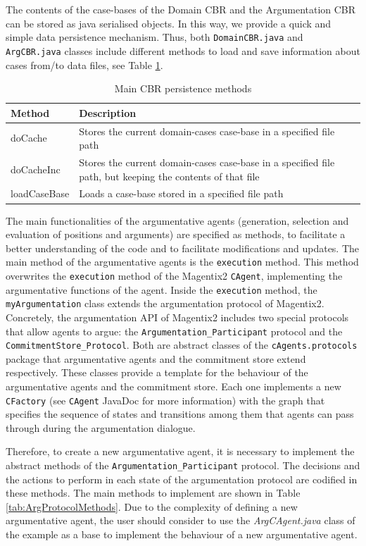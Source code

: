 The contents of the case-bases of the Domain CBR and the Argumentation CBR can be stored as java serialised objects. In this way, we provide a quick and simple data persistence mechanism. Thus, both \lstinline{DomainCBR.java} and \lstinline{ArgCBR.java} classes include different methods to load and save information about cases from/to data files, see Table \ref{tab:CBRPersistenceMethods}.
\begin{table}[h!t]
\begin{tabular}{|l|p{11cm}|}
\hline
\textbf{Method} &  \textbf{Description} \\ \hline
doCache &  Stores the current domain-cases case-base in a specified file path \\ \hline
doCacheInc &  Stores the current domain-cases case-base in a specified file path, but keeping the contents of that file \\ \hline
loadCaseBase &  Loads a case-base stored in a specified file path \\ \hline
\end{tabular}
\caption{Main CBR persistence methods}
\label{tab:CBRPersistenceMethods}
\end{table}

The main functionalities of the argumentative agents (generation, selection and evaluation of positions and arguments) are specified as methods, to facilitate a better understanding of the code and to facilitate modifications and updates. The main method of the argumentative agents is the \lstinline{execution} method. This method overwrites the \lstinline{execution} method of the Magentix2 \texttt{CAgent}, implementing the argumentative functions of the agent. Inside the \lstinline{execution} method, the \lstinline{myArgumentation} class extends the argumentation protocol of Magentix2. Concretely, the argumentation API of Magentix2 includes two special protocols that allow agents to argue: the \texttt{Argumentation\_Participant} protocol and the \texttt{CommitmentStore\_Protocol}. Both are abstract classes of the \lstinline{cAgents.protocols} package that argumentative agents and the commitment store extend respectively. These classes provide a template for the behaviour of the argumentative agents and the commitment store. Each one implements a new \texttt{CFactory} (see \texttt{CAgent} JavaDoc for more information) with the graph that specifies the sequence of states and transitions among them that agents can pass through during the argumentation dialogue.

Therefore, to create a new argumentative agent, it is necessary to implement the abstract methods of the \texttt{Argumentation\_Participant} protocol. The decisions and the actions to perform in each state of the argumentation protocol are codified in these methods. The main methods to implement are shown in Table \ref{tab:ArgProtocolMethods}. Due to the complexity of defining a new argumentative agent, the user should consider to use the \textit{ArgCAgent.java} class of the example as a base to implement the behaviour of a new argumentative agent.

